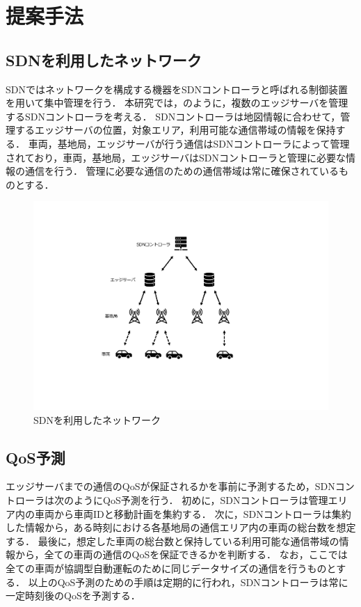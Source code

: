 \documentclass[a4paper,10pt,twocolumn,uplatex]{jsarticle}
\begin{document}
\section{提案手法}
\subsection{SDNを利用したネットワーク}
SDNではネットワークを構成する機器をSDNコントローラと呼ばれる制御装置を用いて集中管理を行う．
本研究では，のように，複数のエッジサーバを管理するSDNコントローラを考える．
SDNコントローラは地図情報に合わせて，管理するエッジサーバの位置，対象エリア，利用可能な通信帯域の情報を保持する．
車両，基地局，エッジサーバが行う通信はSDNコントローラによって管理されており，車両，基地局，エッジサーバはSDNコントローラと管理に必要な情報の通信を行う．
管理に必要な通信のための通信帯域は常に確保されているものとする．

\begin{figure}[t]
	\begin{centering}
    \includegraphics[width=0.96\linewidth]{img/2023_11_SDNネットワーク.pdf}
    \caption{SDNを利用したネットワーク}
    \label{fig:SDNnetwork}
    \end{centering}
\end{figure}

\subsection{QoS予測}
\label{QoSprediction}
エッジサーバまでの通信のQoSが保証されるかを事前に予測するため，SDNコントローラは次のようにQoS予測を行う．
初めに，SDNコントローラは管理エリア内の車両から車両IDと移動計画を集約する．
次に，SDNコントローラは集約した情報から，ある時刻における各基地局の通信エリア内の車両の総台数を想定する．
最後に，想定した車両の総台数と保持している利用可能な通信帯域の情報から，全ての車両の通信のQoSを保証できるかを判断する．
なお，ここでは全ての車両が協調型自動運転のために同じデータサイズの通信を行うものとする．
以上のQoS予測のための手順は定期的に行われ，SDNコントローラは常に一定時刻後のQoSを予測する．
\end{document}
